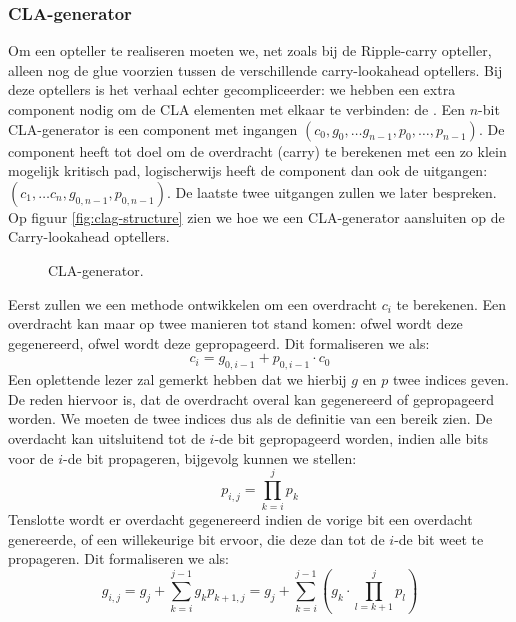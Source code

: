 \subsubsection{CLA-generator}
Om een opteller te realiseren moeten we, net zoals bij de Ripple-carry opteller, alleen nog de glue voorzien tussen de verschillende carry-lookahead optellers. Bij deze optellers is het verhaal echter gecompliceerder: we hebben een extra component nodig om de CLA elementen met elkaar te verbinden: de . Een $n$-bit CLA-generator is een component met ingangen $\left(c_0,g_0,\ldots g_{n-1},p_0,\ldots,p_{n-1}\right)$. De component heeft tot doel om de overdracht (carry) te berekenen met een zo klein mogelijk kritisch pad, logischerwijs heeft de component dan ook de uitgangen: $\left(c_1,\ldots c_n,g_{0,n-1},p_{0,n-1}\right)$. De laatste twee uitgangen zullen we later bespreken. Op figuur \ref{fig:clag-structure} zien we hoe we een CLA-generator aansluiten op de Carry-lookahead optellers.
\begin{figure}[hbt]
\centering
{}
\caption{CLA-generator.}
\end{figure}
Eerst zullen we een methode ontwikkelen om een overdracht $c_i$ te berekenen. Een overdracht kan maar op twee manieren tot stand komen: ofwel wordt deze gegenereerd, ofwel wordt deze gepropageerd. Dit formaliseren we als:
\begin{equation}
c_i=g_{0,i-1}+p_{0,i-1}\cdot c_0
\end{equation}
Een oplettende lezer zal gemerkt hebben dat we hierbij $g$ en $p$ twee indices geven. De reden hiervoor is, dat de overdracht overal kan gegenereerd of gepropageerd worden. We moeten de twee indices dus als de definitie van een bereik zien. De overdacht kan uitsluitend tot de $i$-de bit gepropageerd worden, indien alle bits voor de $i$-de bit propageren, bijgevolg kunnen we stellen:
\begin{equation}
p_{i,j}=\displaystyle\prod_{k=i}^j{p_k}
\end{equation}
Tenslotte wordt er overdacht gegenereerd indien de vorige bit een overdacht genereerde, of een willekeurige bit ervoor, die deze dan tot de $i$-de bit weet te propageren. Dit formaliseren we als:
\begin{equation}
g_{i,j}=g_j+\displaystyle\sum_{k=i}^{j-1}{g_kp_{k+1,j}}=g_j+\displaystyle\sum_{k=i}^{j-1}{\left(g_k\cdot\displaystyle\prod_{l=k+1}^j{p_l}\right)}
\end{equation}
